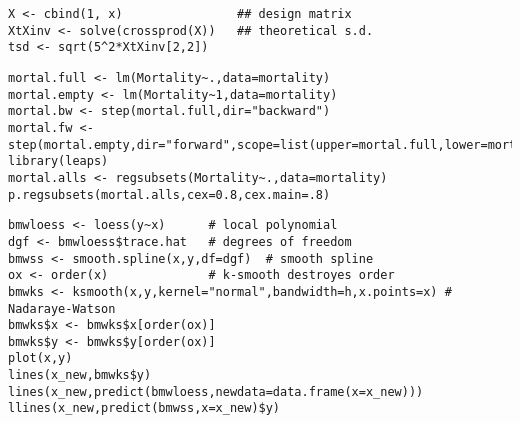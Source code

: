 \vspace{-5pt}



\begin{lstlisting}[style=RStyle, caption={Theoretical True distribution},numbers=none]
X <- cbind(1, x)                ## design matrix
XtXinv <- solve(crossprod(X))   ## theoretical s.d.
tsd <- sqrt(5^2*XtXinv[2,2])
\end{lstlisting}

\vspace{-14pt}

\begin{lstlisting}[style=RStyle, caption={Backward/Forward Selection},numbers=none]
mortal.full <- lm(Mortality~.,data=mortality)
mortal.empty <- lm(Mortality~1,data=mortality)
mortal.bw <- step(mortal.full,dir="backward")
mortal.fw <- step(mortal.empty,dir="forward",scope=list(upper=mortal.full,lower=mortal.empty))
library(leaps)
mortal.alls <- regsubsets(Mortality~.,data=mortality)
p.regsubsets(mortal.alls,cex=0.8,cex.main=.8)
\end{lstlisting}

\vspace{-14pt}

\begin{lstlisting}[style=RStyle, caption={Non-parametric Regression},numbers=none]
bmwloess <- loess(y~x)      # local polynomial
dgf <- bmwloess$trace.hat   # degrees of freedom
bmwss <- smooth.spline(x,y,df=dgf)  # smooth spline
ox <- order(x)              # k-smooth destroyes order
bmwks <- ksmooth(x,y,kernel="normal",bandwidth=h,x.points=x) # Nadaraye-Watson
bmwks$x <- bmwks$x[order(ox)]
bmwks$y <- bmwks$y[order(ox)]
plot(x,y)
lines(x_new,bmwks$y)
lines(x_new,predict(bmwloess,newdata=data.frame(x=x_new)))
llines(x_new,predict(bmwss,x=x_new)$y)
\end{lstlisting}




